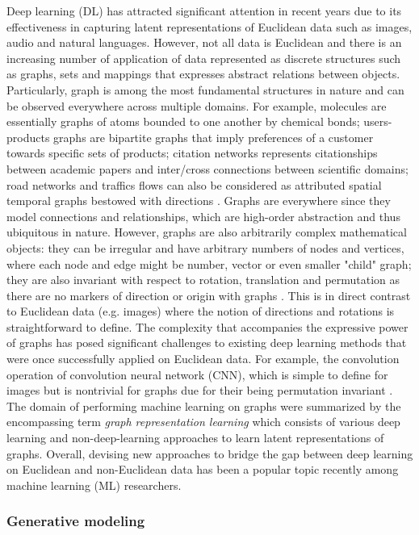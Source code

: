 Deep learning (DL) has attracted significant attention in recent years due to
its effectiveness in capturing latent representations of Euclidean data such as
images, audio and natural languages. However, not all data is Euclidean and
there is an increasing number of application of data represented as discrete
structures such as graphs, sets and mappings that expresses abstract relations
between objects. Particularly, graph is among the most fundamental structures in
nature and can be observed everywhere across multiple domains. For example,
molecules are essentially graphs of atoms bounded to one another by chemical
bonds; users-products graphs are bipartite graphs that imply preferences of a
customer towards specific sets of products; citation networks represents
citationships between academic papers and inter/cross connections between
scientific domains; road networks and traffics flows can also be considered as
attributed spatial temporal graphs bestowed with directions
\cite{bronsteinGeometricDeepLearning2017}. Graphs are everywhere since they
model connections and relationships, which are high-order abstraction and thus
ubiquitous in nature. However, graphs are also arbitrarily complex mathematical
objects: they can be irregular and have arbitrary numbers of nodes and vertices,
where each node and edge might be number, vector or even smaller "child" graph;
they are also invariant with respect to rotation, translation and permutation as
there are no markers of direction or origin with graphs
\cite{bronsteinGeometricDeepLearning2017}. This is in direct contrast to
Euclidean data (e.g. images) where the notion of directions and rotations is
straightforward to define. The complexity that accompanies the expressive power
of graphs has posed significant challenges to existing deep learning methods
that were once successfully applied on Euclidean data. For example, the
convolution operation of convolution neural network (CNN), which is simple to
define for images but is nontrivial for graphs due for their being permutation
invariant \cite{wuComprehensiveSurveyGraph2021}. The domain of performing
machine learning on graphs were summarized by the encompassing term
\textit{graph representation learning} which consists of various deep learning
and non-deep-learning approaches to learn latent representations of graphs.
Overall, devising new approaches to bridge the gap between deep learning on
Euclidean and non-Euclidean data has been a popular topic recently among
machine learning (ML) researchers.


\subsubsection{Generative modeling}

